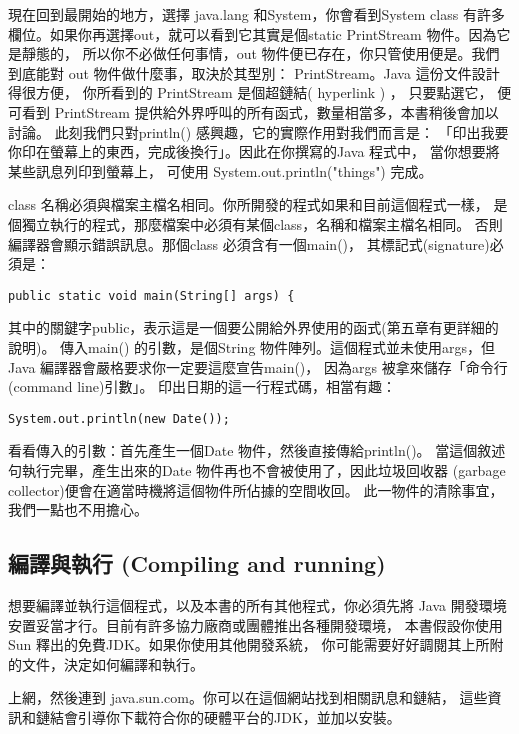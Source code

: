 現在回到最開始的地方，選擇 java.lang 和System，你會看到System class 有許多欄位。如果你再選擇out，就可以看到它其實是個static PrintStream 物件。因為它是靜態的，
所以你不必做任何事情，out 物件便已存在，你只管使用便是。我們到底能對
out 物件做什麼事，取決於其型別： PrintStream。Java 這份文件設計得很方便，
你所看到的 PrintStream 是個超鏈結( hyperlink ) ， 只要點選它， 便可看到
PrintStream 提供給外界呼叫的所有函式，數量相當多，本書稍後會加以討論。
此刻我們只對println() 感興趣，它的實際作用對我們而言是：
「印出我要你印在螢幕上的東西，完成後換行」。因此在你撰寫的Java 程式中，
當你想要將某些訊息列印到螢幕上， 可使用
System.out.println("things") 完成。

class
名稱必須與檔案主檔名相同。你所開發的程式如果和目前這個程式一樣，
是個獨立執行的程式，那麼檔案中必須有某個class，名稱和檔案主檔名相同。
否則編譯器會顯示錯誤訊息。那個class 必須含有一個main()，
其標記式(signature)必須是：

\begin{Verbatim}[frame=single]
public static void main(String[] args) {
\end{Verbatim}

其中的關鍵字public，表示這是一個要公開給外界使用的函式(第五章有更詳細的說明)。
傳入main() 的引數，是個String 物件陣列。這個程式並未使用args，但
Java 編譯器會嚴格要求你一定要這麼宣告main()，
因為args 被拿來儲存「命令行(command line)引數」。
印出日期的這一行程式碼，相當有趣：

\begin{Verbatim}[frame=single]
System.out.println(new Date());
\end{Verbatim}

看看傳入的引數：首先產生一個Date 物件，然後直接傳給println()。
當這個敘述句執行完畢，產生出來的Date 物件再也不會被使用了，因此垃圾回收器
(garbage collector)便會在適當時機將這個物件所佔據的空間收回。
此一物件的清除事宜，我們一點也不用擔心。

\subsection{編譯與執行 (Compiling and running)}

想要編譯並執行這個程式，以及本書的所有其他程式，你必須先將
Java 開發環境安置妥當才行。目前有許多協力廠商或團體推出各種開發環境，
本書假設你使用Sun 釋出的免費JDK。如果你使用其他開發系統，
你可能需要好好調閱其上所附的文件，決定如何編譯和執行。

上網，然後連到 java.sun.com。你可以在這個網站找到相關訊息和鏈結，
這些資訊和鏈結會引導你下載符合你的硬體平台的JDK，並加以安裝。


